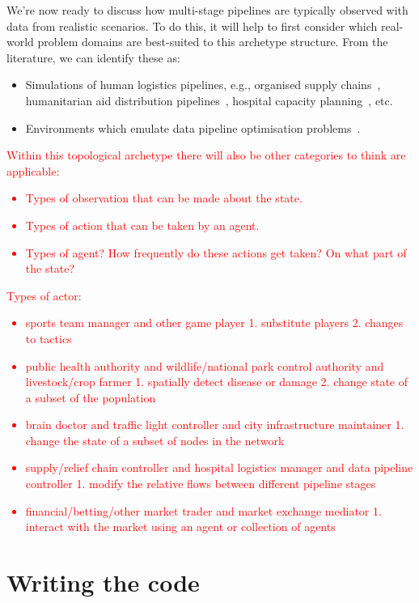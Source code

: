 We're now ready to discuss how multi-stage pipelines are typically observed with data from realistic scenarios. To do this, it will help to first consider which real-world problem domains are best-suited to this archetype structure. From the literature, we can identify these as:
\begin{itemize}
\item{Simulations of human logistics pipelines, e.g., organised supply chains~\cite{yan2022reinforcement}, humanitarian aid distribution pipelines~\cite{yu2021reinforcement}, hospital capacity planning~\cite{shuvo2021deep}, etc. }
\item{Environments which emulate data pipeline optimisation problems~\cite{nagrecha2023intune}.}
\end{itemize}

\textcolor{red}{Within this topological archetype there will also be other categories to think are applicable:
\begin{itemize}
\item{Types of observation that can be made about the state.}
\item{Types of action that can be taken by an agent.}
\item{Types of agent? How frequently do these actions get taken? On what part of the state?}
\end{itemize}
}


\textcolor{red}{Types of actor:
\begin{itemize}
\item{sports team manager and other game player 1. substitute players 2. changes to tactics}
\item{public health authority and wildlife/national park control authority and livestock/crop farmer 1. spatially detect disease or damage 2. change state of a subset of the population}
\item{brain doctor and traffic light controller and city infrastructure maintainer 1. change the state of a subset of nodes in the network}
\item{supply/relief chain controller and hospital logistics manager and data pipeline controller 1. modify the relative flows between different pipeline stages}
\item{financial/betting/other market trader and market exchange mediator 1. interact with the market using an agent or collection of agents}
\end{itemize}}

\section{\sffamily Writing the code}